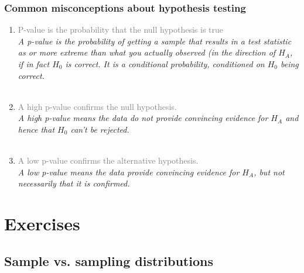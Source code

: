 \documentclass[11pt,containsverbatim,handout,xcolor=xelatex,dvipsnames,table]{beamer}
\begin{document}
\begin{frame}
\frametitle{Common misconceptions about hypothesis testing}

\begin{enumerate}

\item \textcolor{gray}{P-value is the probability that the null hypothesis is true} \\
\textit{A p-value is the probability of getting a sample that results in a test statistic as or more extreme than what you actually observed (in the direction of $H_A$, if in fact $H_0$ is correct. It is a conditional probability, conditioned on $H_0$ being correct.} \\
$\:$ \\

\pause

\item  \textcolor{gray}{A high p-value confirms the null hypothesis.}\\
\textit{A high p-value means the data do not provide convincing evidence for $H_A$ and hence that $H_0$ can't be rejected.} \\
$\:$ \\

\pause

\item   \textcolor{gray}{A low p-value confirms the alternative hypothesis.} \\
\textit{A low p-value means the data provide convincing evidence for $H_A$, but not necessarily that it is confirmed.} \\

\end{enumerate}

\end{frame}


\section{Exercises}


\subsection{Sample vs. sampling distributions}

\end{document}
